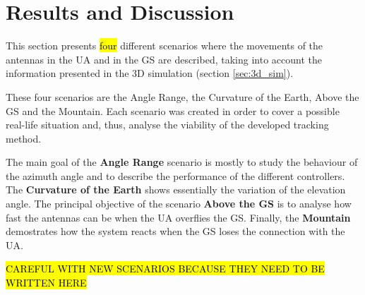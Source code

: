 \chapter{Results and Discussion}\label{ch:results}

This section presents \hl{four} different scenarios where the movements of the antennas in the UA and in the GS are described, taking into account the information presented in the 3D simulation (section \ref{sec:3d_sim}).

These four scenarios are the Angle Range, the Curvature of the Earth, Above the GS and the Mountain. Each scenario was created in order to cover a possible real-life situation and, thus, analyse the viability of the developed tracking method.

The main goal of the \textbf{Angle Range} scenario is mostly to study the behaviour of the azimuth angle and to describe the performance of the different controllers. The \textbf{Curvature of the Earth} shows essentially the variation of the elevation angle. The principal objective of the scenario \textbf{Above the GS} is to analyse how fast the antennas can be when the UA overflies the GS. Finally, the \textbf{Mountain} demostrates how the system reacts when the GS loses the connection with the UA. 

\hl{CAREFUL WITH NEW SCENARIOS BECAUSE THEY NEED TO BE WRITTEN HERE}